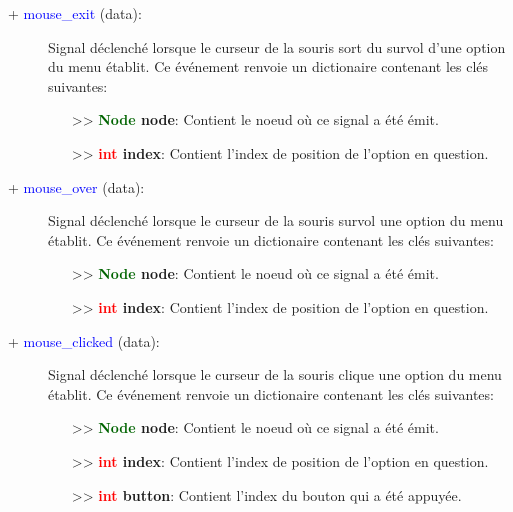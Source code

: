 \documentclass[a4paper, 11pt]{article}
\begin{document}
	\begin{description}
		\item [+ \textcolor{blue}{mouse\_exit} (data):] Signal déclenché lorsque le curseur de la souris 
		sort du survol d'une option du menu établit. Ce événement renvoie un dictionaire contenant les clés 
		suivantes:
		\begin{itemize}
			\item [>> \textbf{\textcolor{darkgreen}{Node} node}:] Contient le noeud où ce signal a été émit.
			\item [>> \textbf{\textcolor{red}{int} index}:] Contient l'index de position de l'option en 
			question.\\
		\end{itemize}
	\end{description}
	\begin{description}
		\item [+ \textcolor{blue}{mouse\_over} (data):] Signal déclenché lorsque le curseur de la souris 
		survol une option du menu établit. Ce événement renvoie un dictionaire contenant les clés suivantes:
		\begin{itemize}
			\item [>> \textbf{\textcolor{darkgreen}{Node} node}:] Contient le noeud où ce signal a été émit.
			\item [>> \textbf{\textcolor{red}{int} index}:] Contient l'index de position de l'option en 
			question.\\
		\end{itemize}
	\end{description}
	\begin{description}
		\item [+ \textcolor{blue}{mouse\_clicked} (data):] Signal déclenché lorsque le curseur de la souris 
		clique une option du menu établit. Ce événement renvoie un dictionaire contenant les clés suivantes:
		\begin{itemize}
			\item [>> \textbf{\textcolor{darkgreen}{Node} node}:] Contient le noeud où ce signal a été émit.
			\item [>> \textbf{\textcolor{red}{int} index}:] Contient l'index de position de l'option en 
			question.
			\item [>> \textbf{\textcolor{red}{int} button}:] Contient l'index du bouton qui a été appuyée.\\
		\end{itemize}
	\end{description}
\end{document}
